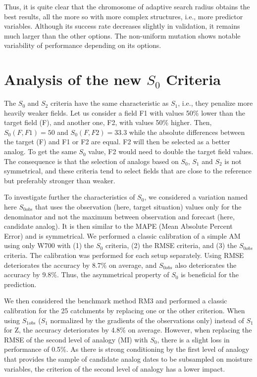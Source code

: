 \documentclass[draft]{agujournal2019}
\begin{document}
Thus, it is quite clear that the chromosome of adaptive search radius obtains the best results, all the more so with more complex structures, i.e., more predictor variables. Although its success rate decreases slightly in validation, it remains much larger than the other options. The non-uniform mutation shows notable variability of performance depending on its options.

\FloatBarrier

\section{Analysis of the new $S_{0}$ Criteria}

The $S_{0}$ and $S_{2}$ criteria have the same characteristic as $S_{1}$, i.e., they penalize more heavily weaker fields. Let us consider a field F1 with values 50\% lower than the target field (F), and another one, F2, with values 50\% higher. Then, $S_{0}(F, F1) = 50$ and $S_{0}(F, F2) = 33.3$ while the absolute differences between the target (F) and F1 or F2 are equal. F2 will then be selected as a better analog. To get the same $S_{0}$ value, F2 would need to double the target field values. The consequence is that the selection of analogs based on $S_{0}$, $S_{1}$ and $S_{2}$ is not symmetrical, and these criteria tend to select fields that are close to the reference but preferably stronger than weaker. 

To investigate further the characteristics of $S_{0}$, we considered a variation named here $S_{0obs}$ that uses the observation (here, target situation) values only for the denominator and not the maximum between observation and forecast (here, candidate analog). It is then similar to the MAPE (Mean Absolute Percent Error) and is symmetrical. We performed a classic calibration of a simple AM using only W700 with (1) the $S_{0}$ criteria, (2) the RMSE criteria, and (3) the $S_{0obs}$ criteria. The calibration was performed for each setup separately. Using RMSE deteriorates the accuracy by 8.7\% on average, and $S_{0obs}$ also deteriorates the accuracy by 9.8\%. Thus, the asymmetrical property of $S_{0}$ is beneficial for the prediction. 

We then considered the benchmark method RM3 and performed a classic calibration for the 25 catchments by replacing one or the other criterion. When using $S_{1obs}$ ($S_{1}$ normalized by the gradients of the observations only) instead of $S_{1}$ for Z, the accuracy deteriorates by 4.8\% on average. However, when replacing the RMSE of the second level of analogy (MI) with $S_{0}$, there is a slight loss in performance of 0.5\%. As there is strong conditioning by the first level of analogy that provides the sample of candidate analog dates to be subsampled on moisture variables, the criterion of the second level of analogy has a lower impact.
\end{document}
